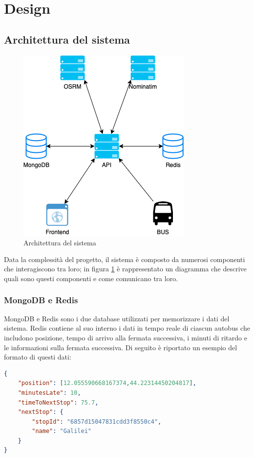 
\section{Design}

\subsection{Architettura del sistema}

\begin{figure}
    \centering
    \includegraphics[width=0.6\linewidth]{images/architecture_diagram.png}
    \caption{Architettura del sistema}
    \label{fig:architecture-diagram}
\end{figure}

Data la complessità del progetto, il sistema è composto da numerosi componenti che interagiscono tra loro; in figura \ref{fig:architecture-diagram} è rappresentato un diagramma che descrive quali sono questi componenti e come comunicano tra loro.

\subsubsection{MongoDB e Redis}

MongoDB e Redis sono i due database utilizzati per memorizzare i dati del sistema.
Redis contiene al suo interno i dati in tempo reale di ciascun autobus che includono posizione, tempo di arrivo alla fermata successiva, i minuti di ritardo e le informazioni sulla fermata successiva. Di seguito è riportato un esempio del formato di questi dati:
\begin{lstlisting}[language=json]
{
    "position": [12.055590668167374,44.22314450204817],
    "minutesLate": 10,
    "timeToNextStop": 75.7,
    "nextStop": {
        "stopId": "6857d15047831cdd3f8550c4",
        "name": "Galilei"
    }
}
\end{lstlisting}

